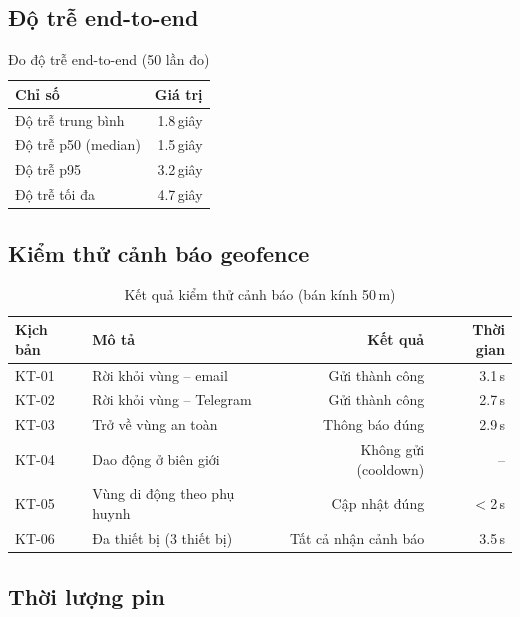 \documentclass[13pt, a4paper]{report}
\begin{document}
\subsection{Độ trễ end-to-end}

\begin{table}[H]
\centering
\caption{Đo độ trễ end-to-end (50 lần đo)}
\label{tab:latency}
\begin{tabular}{l r}
\toprule
\textbf{Chỉ số} & \textbf{Giá trị} \\
\midrule
Độ trễ trung bình   & 1.8\,giây \\
Độ trễ p50 (median) & 1.5\,giây \\
Độ trễ p95          & 3.2\,giây \\
Độ trễ tối đa       & 4.7\,giây \\
\bottomrule
\end{tabular}
\end{table}

\subsection{Kiểm thử cảnh báo geofence}

\begin{table}[H]
\centering
\caption{Kết quả kiểm thử cảnh báo (bán kính 50\,m)}
\label{tab:geofence_test}
\begin{tabularx}{\textwidth}{l X r r}
\toprule
\textbf{Kịch bản} & \textbf{Mô tả} & \textbf{Kết quả} & \textbf{Thời gian} \\
\midrule
KT-01 & Rời khỏi vùng -- email      & Gửi thành công       & 3.1\,s \\
KT-02 & Rời khỏi vùng -- Telegram   & Gửi thành công       & 2.7\,s \\
KT-03 & Trở về vùng an toàn         & Thông báo đúng       & 2.9\,s \\
KT-04 & Dao động ở biên giới        & Không gửi (cooldown) & -- \\
KT-05 & Vùng di động theo phụ huynh & Cập nhật đúng        & $<$2\,s \\
KT-06 & Đa thiết bị (3 thiết bị)   & Tất cả nhận cảnh báo & 3.5\,s \\
\bottomrule
\end{tabularx}
\end{table}

\subsection{Thời lượng pin}
\end{document}
